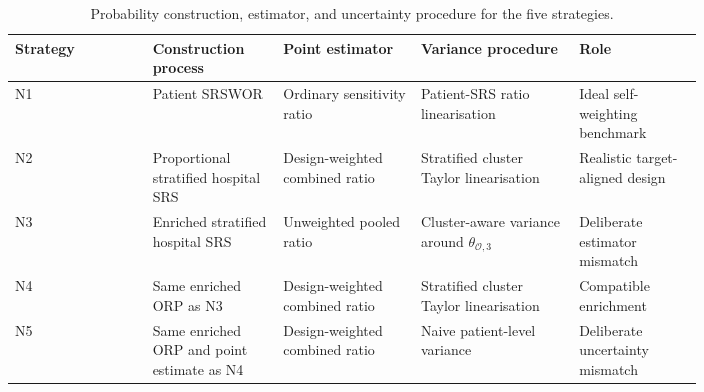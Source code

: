 \begin{table}[h!]
\centering
\small
\caption{Probability construction, estimator, and uncertainty procedure for the five strategies.}
\label{tab:nav-strategies}
\begin{tabular}{lp{0.19\linewidth}p{0.20\linewidth}p{0.23\linewidth}p{0.18\linewidth}}
\toprule
Strategy & Construction process & Point estimator & Variance procedure & Role \\
\midrule
N1 & Patient SRSWOR & Ordinary sensitivity ratio & Patient-SRS ratio linearisation & Ideal self-weighting benchmark \\
N2 & Proportional stratified hospital SRS & Design-weighted combined ratio & Stratified cluster Taylor linearisation & Realistic target-aligned design \\
N3 & Enriched stratified hospital SRS & Unweighted pooled ratio & Cluster-aware variance around $\theta_{\mathcal O,3}$ & Deliberate estimator mismatch \\
N4 & Same enriched ORP as N3 & Design-weighted combined ratio & Stratified cluster Taylor linearisation & Compatible enrichment \\
N5 & Same enriched ORP and point estimate as N4 & Design-weighted combined ratio & Naive patient-level variance & Deliberate uncertainty mismatch \\
\bottomrule
\end{tabular}
\end{table}

